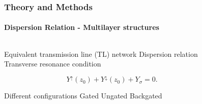 \documentclass[mathserif,16pt,xcolor=table]{beamer}
\begin{document}
      \begin{frame}
        \frametitle{Theory and Methods}
        \framesubtitle{Dispersion Relation - Multilayer structures}
        \begin{columns}[T] %
          \begin{column}{.45\textwidth}
            \begin{outline}[itemize]
              \1 Equivalent transmission line (TL) network
              \1 Dispersion relation
                \2 Transverse resonance condition
            \end{outline}
            \begin{equation} \nonumber
              Y^{\uparrow}(z_0) + Y^{\downarrow}(z_0) + Y_{\sigma} = 0.
              \label{eq:dispersion}
            \end{equation}
            \begin{outline}[itemize]
              \1 Different configurations
                \2 Gated
                \2 Ungated
                \2 Backgated
              \end{outline}
          \end{column}
          \begin{column}[T]{.65\textwidth}
            \vspace*{-1cm} \hspace*{-2cm}
            \begin{figure}
              \centering \hspace*{-.5cm}
              \fontsize{6}{7}\selectfont
              \def\svgwidth{1.2\linewidth}
              
            \end{figure}
          \end{column}
        \end{columns}
      \end{frame}
\end{document}
